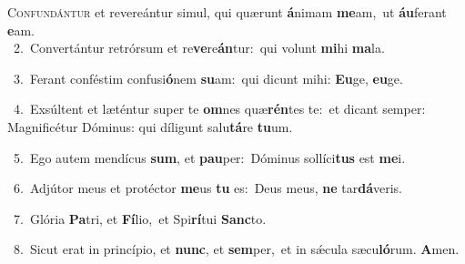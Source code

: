 \lettrine{\initial\textcolor{\initialcolor}{C}}{onfundántur} et revereántur simul, qui quærunt \textbf{á}\-nimam \textbf{me}\-am,~\star ut \textbf{áu}\-ferant \textbf{e}\-am.\\
{\numbfont\textcolor{\numbcolor}{~2.}}~Convertántur retrórsum et re\-\textbf{ve}\-re\-\textbf{án}\-tur:~\star qui volunt \textbf{mi}\-hi \textbf{ma}\-la.\par
{\numbfont\textcolor{\numbcolor}{~3.}}~Ferant conféstim confusi\-\textbf{ó}\-nem \textbf{su}\-am:~\star qui dicunt mihi: \textbf{Eu}\-ge, \textbf{eu}\-ge.\par
{\numbfont\textcolor{\numbcolor}{~4.}}~Exsúltent et læténtur super te \textbf{om}\-nes quæ\-\textbf{rén}\-tes te:~\star et dicant semper: Magnificétur Dóminus: qui díligunt salu\-\textbf{tá}\-re \textbf{tu}\-um.\par
{\numbfont\textcolor{\numbcolor}{~5.}}~Ego autem mendícus \textbf{sum}\-, et \textbf{pau}\-per:~\star Dóminus sollíci\textbf{tus} est \textbf{me}\-i.\par
{\numbfont\textcolor{\numbcolor}{~6.}}~Adjútor meus et protéctor \textbf{me}\-us \textbf{tu} es:~\star Deus meus, \textbf{ne} tar\-\textbf{dá}\-veris.\par
{\numbfont\textcolor{\numbcolor}{~7.}}~Glória \textbf{Pa}\-tri, et \textbf{Fí}\-lio,~\star et Spi\-\textbf{rí}\-tui \textbf{Sanc}\-to.\par
{\numbfont\textcolor{\numbcolor}{~8.}}~Sicut erat in princípio, et \textbf{nunc}\-, et \textbf{sem}\-per,~\star et in sǽcula sæcu\-\textbf{ló}\-rum. \textbf{A}\-men.\par
